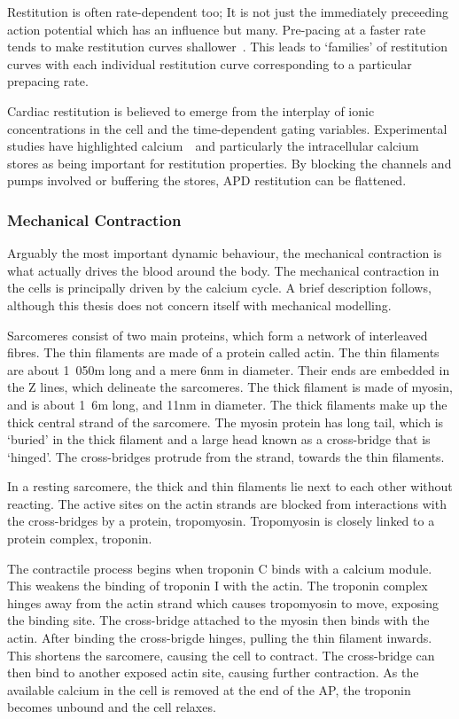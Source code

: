 Restitution is often rate-dependent too; It is not just the immediately
preceeding action potential which has an influence but many.
Pre-pacing at a faster rate tends to make restitution curves
shallower~\cite{Boyett1978}.
This leads to `families' of restitution curves with each individual restitution
curve corresponding to a particular prepacing rate.

Cardiac restitution is believed to emerge from the interplay of ionic
concentrations in the cell and the time-dependent gating variables.
Experimental studies have highlighted calcium~\cite{Goldhaber2005}\ and
particularly the intracellular calcium stores as being important for restitution
properties.
By blocking the channels and pumps involved or buffering the stores, APD
restitution can be flattened.

\subsubsection{Mechanical Contraction}

Arguably the most important dynamic behaviour, the mechanical contraction is
what actually drives the blood around the body.
The mechanical contraction in the cells is principally driven by the calcium
cycle.
A brief description follows, although this thesis does not concern itself with
mechanical modelling.

Sarcomeres consist of two main proteins, which form a network of interleaved fibres.
The thin filaments are made of a protein called actin.
The thin filaments are about \unit{1.050}{\mu m} long and a mere \unit{6}{nm} in diameter.
Their ends are embedded in the Z lines, which delineate the sarcomeres.
The thick filament is made of myosin, and is about \unit{1.6}{\mu m} long, and
\unit{11}{nm} in diameter.
The thick filaments make up the thick central strand of the sarcomere.
The myosin protein has long tail, which is `buried' in the thick filament and a large head known as a cross-bridge that is `hinged'.
The cross-bridges protrude from the strand, towards the thin filaments.

In a resting sarcomere, the thick and thin filaments lie next to each other without reacting.
The active sites on the actin strands are blocked from interactions with the
cross-bridges by a protein, tropomyosin.
Tropomyosin is closely linked to a protein complex, troponin.

The contractile process begins when troponin C binds with a calcium module.
This weakens the binding of troponin I with the actin.
The troponin complex hinges away from the actin strand which causes tropomyosin
to move, exposing the binding site.
The cross-bridge attached to the myosin then binds with the actin.
After binding the cross-brigde hinges, pulling the thin filament inwards.
This shortens the sarcomere, causing the cell to contract.
The cross-bridge can then bind to another exposed actin site, causing further
contraction.
As the available calcium in the cell is removed at the end of the AP, the
troponin becomes unbound and the cell relaxes.

